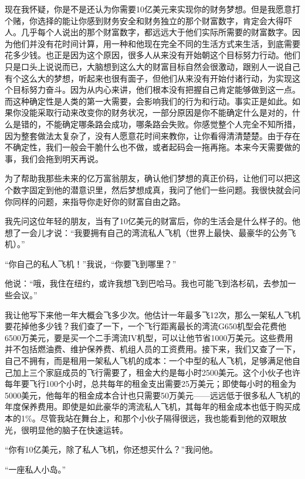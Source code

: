 现在我怀疑，你是不是还认为你需要10亿美元来实现你的财务梦想。但是我愿意打个赌，你选择的能让你感到财务安全和财务独立的那个财富数字，肯定会大得吓人。几乎每个人说出的那个财富数字，都远远大于他们实际所需要的财富数字。因为他们并没有花时间计算，用一种和他现在完全不同的生活方式来生活，到底需要花多少钱。也正是因为这个原因，很多人从来没有开始朝这个目标努力行动。他们只是口头上说说而已，大脑想到这么大的财富目标自然会很激动，跟别人一说自己有个这么大的梦想，听起来也很有面子，但他们从来没有开始付诸行动，为实现这个目标努力奋斗。因为从内心来讲，他们根本没有把握自己肯定能够做到这一点。而这种确定性是人类的第一大需要，会影响我们的行为和行动。事实正是如此。如果你没能采取行动来改变你的财务状况，一部分原因是你不能确定什么是对的，什么是错的，不能确定哪条路会成功，哪条路会失败。你感觉整个人完全不知所措，因为整套做法太复杂了，没有人愿意花时间来教你，让你看得清清楚楚。由于存在不确定性，我们一般会干脆什么也不做，或者起码会一拖再拖。本来今天需要做的事，我们会拖到明天再说。

为了帮助我那些未来的亿万富翁朋友，确认他们梦想的真正价码，让他们可以把这个数字固定到他的潜意识里，然后梦想成真，我问了他们一些问题。我很快就会问你同样的问题，来指导你走好你的财富自由之路。

我先问这位年轻的朋友，当有了10亿美元的财富后，你的生活会是什么样子的。他想了一会儿才说：“我要拥有自己的湾流私人飞机（世界上最快、最豪华的公务飞机）。”

“你自己的私人飞机！”我说，“你要飞到哪里？”

他说：“哦，我住在纽约，或许我想飞到巴哈马。我也可能飞到洛杉矶，去参加一些会议。”

我让他写下来他一年大概会飞多少次。他估计一年最多飞12次，那么一架私人飞机要花掉他多少钱？我们查了一下，一个飞行距离最长的湾流G650机型会花费他6500万美元，要是买一个二手湾流IV机型，可以让他节省1000万美元。这些费用并不包括燃油费、维护保养费、机组人员的工资费用。接下来，我们又查了一下，自己不拥有，而是租用一架私人飞机的成本：一个中型的私人飞机，足够满足他自己加上三个家庭成员的飞行需要了，租金大约是每小时2500美元。这个小伙子也许每年要飞行100个小时，总共每年的租金支出需要25万美元；即使每小时的租金为5000美元，他每年的租金成本合计也只需要50万美元——远远低于很多私人飞机的年度保养费用。即使是如此豪华的湾流私人飞机，其每年的租金成本也低于购买成本的1\%。尽管我站在舞台上，和那个小伙子隔得很远，我也能看到他的双眼放光，很明显他的脑子在快速运转。

“你有10亿美元，除了私人飞机，你还想买什么？”我问他。

“一座私人小岛。”

